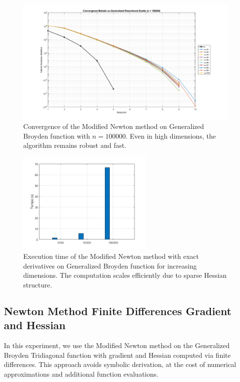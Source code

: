 \documentclass[a4paper,12pt]{article}
\begin{document}
	\newpage
	\begin{figure}[htbp]
		\centering
		\includegraphics[width=\textwidth]{../immagini/broyden_100k.png}
		\caption{Convergence of the Modified Newton method on Generalized Broyden function with $n=100000$. Even in high dimensions, the algorithm remains robust and fast.}
		\label{fig:gb_100k_exact}
	\end{figure}
	\newpage
	\begin{figure}[htbp]
		\centering
		\includegraphics[width=0.6\textwidth]{../immagini/broyden_time_exact.png}
		\caption{Execution time of the Modified Newton method with exact derivatives on Generalized Broyden function for increasing dimensions. The computation scales efficiently due to sparse Hessian structure.}
		\label{fig:gb_time_exact}
	\end{figure}
	
	
	\subsection{Newton Method Finite Differences Gradient and Hessian}
	
	In this experiment, we use the Modified Newton method on the Generalized Broyden Tridiagonal function with gradient and Hessian computed via finite differences. This approach avoids symbolic derivation, at the cost of numerical approximations and additional function evaluations.
	
\end{document}

